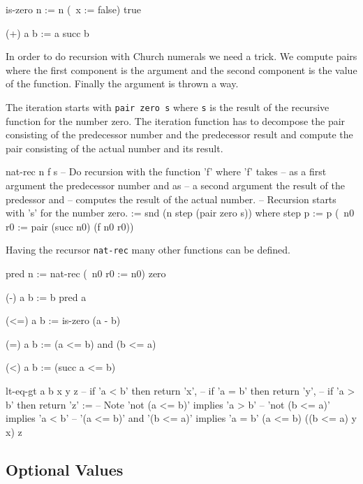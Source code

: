 \documentclass[12pt]{article}
\begin{document}
\begin{lam}
    is-zero n :=
        n (\ x := false) true

    (+) a b := a succ b
\end{lam}

In order to do recursion with Church numerals we need a trick. We compute pairs
where the first component is the argument and the second component is the value
of the function. Finally the argument is thrown a way.

The iteration starts with {\tt pair zero s} where {\tt s} is the result of the
recursive function for the number zero. The iteration function has to decompose
the pair consisting of the predecessor number and the predecessor result and
compute the pair consisting of the actual number and its result.
\begin{lam}
    nat-rec n f s
        -- Do recursion with the function 'f' where 'f' takes
        -- as a first argument the predecessor number and as
        -- a second argument the result of the predessor and
        -- computes the result of the actual number.
        -- Recursion starts with 's' for the number zero.
    :=
        snd (n step (pair zero s)) where
          step p :=
            p (\ n0 r0 := pair (succ n0) (f n0 r0))
\end{lam}


Having the recursor {\tt nat-rec} many other functions can be defined.

\begin{lam}
    pred n :=
        nat-rec (\ n0 r0 := n0) zero

    (-) a b := b pred a

    (<=) a b := is-zero (a - b)

    (=)  a b := (a <= b) and (b <= a)

    (<)  a b := (succ a <= b)

    lt-eq-gt a b x y z
        -- if 'a < b' then return 'x',
        -- if 'a = b' then return 'y',
        -- if 'a > b' then return 'z'
    :=
            -- Note 'not (a <= b)' implies 'a > b'
            --      'not (b <= a)' implies 'a < b'
            --      '(a <= b)' and '(b <= a)' implies 'a = b'
        (a <= b) ((b <= a) y x) z
\end{lam}









\subsection{Optional Values}
\label{sec-optional-values}
\end{document}
